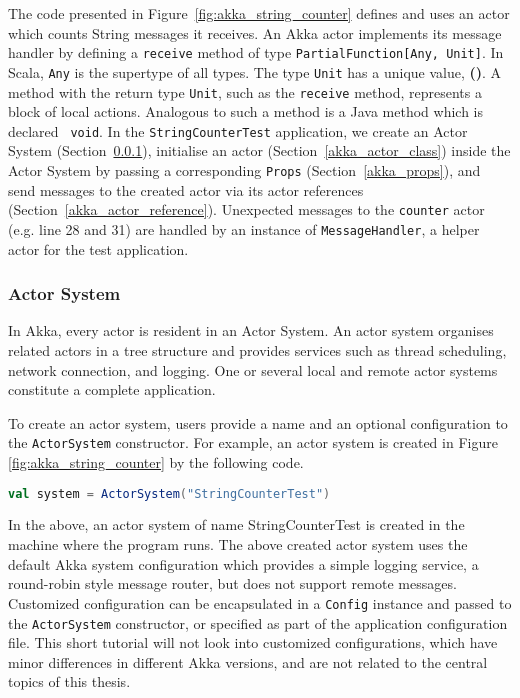 The code presented in Figure~\ref{fig:akka_string_counter} defines and uses an
actor which counts String messages it receives.  An Akka actor implements its 
message handler by defining a {\tt receive} method of type 
{\tt PartialFunction[Any, Unit]}.  In Scala, {\tt Any} is the supertype of all types.  
The type {\tt Unit} has a unique value, {\bf ()}.  A method with the return 
type {\tt Unit}, such as the  {\tt receive} method, represents a block of local 
actions.  Analogous to such a method is a Java method which is declared {\tt 
void}. In the {\tt StringCounterTest} application, we create an Actor System 
(Section~\ref{akka_actor_system}), initialise an actor (Section~\ref{akka_actor_class}) 
inside the Actor System by passing a corresponding {\tt Props} (Section~\ref{akka_props}),
and send messages to the created actor via its actor references (Section~\ref{akka_actor_reference}).
Unexpected messages to the {\tt counter} actor (e.g. line 28 and 31) are handled
by an instance of {\tt  MessageHandler}, a helper actor for the test 
application. 


\subsubsection{Actor System}
\label{akka_actor_system}

In Akka, every actor is resident in an Actor System.  An actor system organises 
related actors in a tree structure and provides services such as thread  
scheduling, network connection, and logging.  One or several local and remote 
actor systems constitute a complete application.  

To create an actor system, users provide a  name and an optional configuration 
to the {\tt ActorSystem} constructor.  For example, an actor system is created 
in Figure  
\ref{fig:akka_string_counter} by the following code. 
\begin{lstlisting}[language=scala]
  val system = ActorSystem("StringCounterTest")
\end{lstlisting}

In the above, an actor system of name \textcolor{mauve}{StringCounterTest} is 
created in the machine where the program runs.  The above created actor system 
uses the default Akka system configuration which provides a simple logging 
service, a round-robin style message router, but does not support remote 
messages.  Customized configuration can be encapsulated in a {\tt Config} 
instance and passed to the {\tt ActorSystem} constructor, or specified as part 
of the application configuration file.  This short tutorial will not look into 
customized configurations, which have minor differences in different Akka 
versions, and are not related to the central topics of this thesis.

